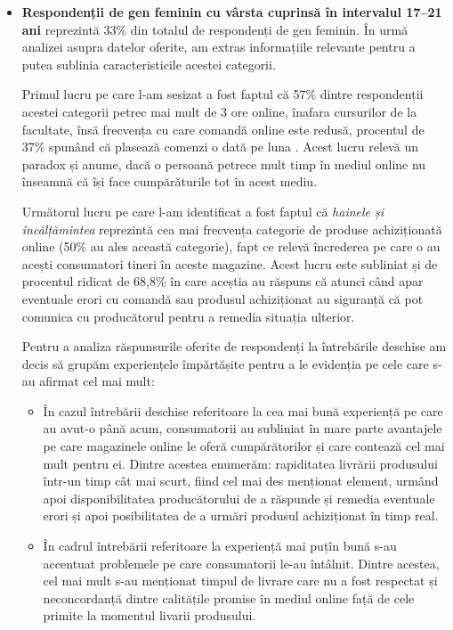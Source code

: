 \documentclass[a4paper, 12pt]{article}
\begin{document}
	\begin{itemize}
		\item \textbf{Respondenții de gen feminin cu vârsta cuprinsă în intervalul 17–21 ani} reprezintă 33\% din totalul de respondenți de gen feminin. În  urmă analizei asupra datelor oferite, am extras informațiile relevante pentru a putea sublinia caracteristicile acestei categorii. 
		
		\quad Primul lucru pe care l-am sesizat a fost faptul că 57\% dintre respondenții acestei categorii petrec mai mult de 3 ore online, înafara cursurilor de la facultate, însă frecvența cu care comandă online este redusă, procentul de  37\% spunând că plasează comenzi o dată pe luna . Acest lucru relevă un paradox și anume, dacă o persoană petrece mult timp în mediul online nu înseamnă că își face cumpărăturile tot în acest mediu.
		
		\quad Următorul lucru pe care l-am identificat a fost faptul că\textit{ hainele și încălțămintea} reprezintă cea mai frecvența categorie de produse achiziționată online (50\% au ales această categorie),  fapt ce relevă încrederea pe care o au acești consumatori tineri în aceste magazine. Acest lucru este subliniat și de procentul ridicat de 68,8\% în care aceștia au răspuns că atunci când apar eventuale erori cu comandă sau produsul achiziționat au siguranță că pot comunica cu producătorul pentru a remedia situația ulterior. 
		
		\quad Pentru a analiza răspunsurile oferite de respondenți la întrebările deschise am decis să grupăm experiențele împărtășite pentru a le evidenția pe cele care s-au afirmat cel mai mult:
		\begin{itemize}
			\item În cazul întrebării deschise referitoare la cea mai bună experiență pe care au avut-o până acum, consumatorii au subliniat în mare parte avantajele pe care magazinele online le oferă cumpărătorilor și care contează cel mai mult pentru ei. Dintre acestea enumerăm: rapiditatea livrării produsului într-un timp cât mai scurt, fiind cel mai des menționat element, urmând apoi disponibilitatea producătorului de a răspunde și remedia eventuale erori și apoi posibilitatea de a urmări produsul achiziționat în timp real.
			\item 	În cadrul întrebării referitoare la experiență mai puțîn bună s-au accentuat problemele pe care consumatorii le-au întâlnit. Dintre acestea, cel mai mult s-au menționat timpul de livrare care nu a fost respectat și neconcordanță dintre calitățile promise în mediul online față de cele primite la momentul livarii produsului. 
		\end{itemize}
	

\end{itemize}
\end{document}
